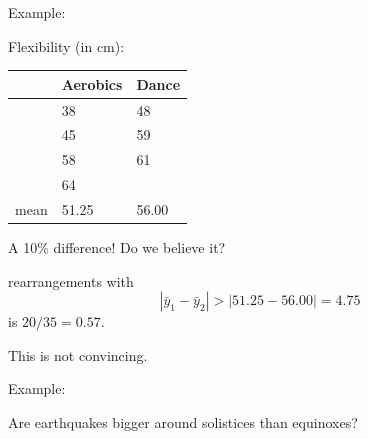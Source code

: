 \begin{frame}{Example: }

    Flexibility (in cm):  
    \begin{center}
      \begin{tabular}{cYY}
        & Aerobics & Dance \\
       \hline
       & 38  & 48 \\
       & 45  & 59 \\
       & 58  & 61 \\
       & 64  & \\
       \hline
       mean & 51.25 & 56.00 \\
     \end{tabular}
   \end{center}
     A 10\% difference!  Do we believe it?

     \vspace{2em}

     \pause

      rearrangements with
     \[
         | \bar y_1 - \bar y_2 | > |51.25-56.00| = 4.75
     \]
     is $20/35 = 0.57$.

     \vspace{1em}
     \pause
     This is \alert{not convincing}.
 
\end{frame}


\begin{frame}{Example:}

    Are earthquakes bigger around solistices than equinoxes?

\end{frame}



